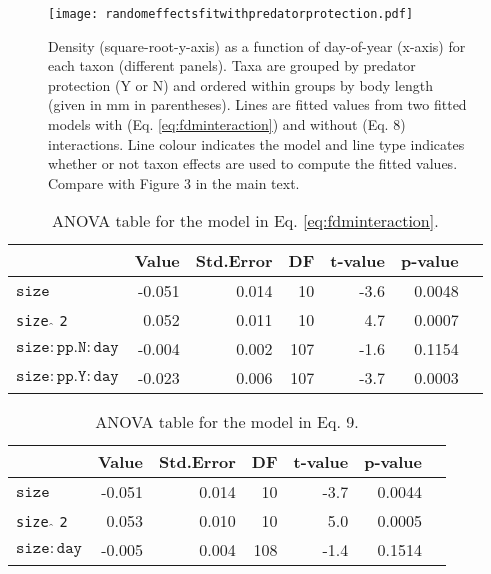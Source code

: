 \documentclass[12pt]{ecologyFORAPPENDIX}
\newcommand{\processfloatnow}{
	\begingroup
	\let\cleardoublepage\relax
	\let\clearpage\relax
	\processdelayedfloats
	\endgroup
}
\begin{document}
\begin{figure}
\vspace{-0.5cm}
\texttt{[image: randomeffectsfitwithpredatorprotection.pdf]}
\caption{Density (square-root-y-axis) as a function of day-of-year (x-axis) for each taxon (different panels).  Taxa are grouped by predator protection (Y or N) and ordered within groups by body length (given in mm in parentheses).  Lines are fitted values from two fitted models with (Eq. \ref{eq:fdminteraction}) and without (Eq. 8) interactions.  Line colour indicates the model and line type indicates whether or not taxon effects are used to compute the fitted values.  Compare with Figure 3 in the main text.}
\label{fig:randomeffectsfitwithpredatorprotection}
\end{figure}
\processfloatnow

\singlespace
\begin{table}
\caption{ANOVA table for the model in Eq. \ref{eq:fdminteraction}.}
\label{tab:ppanova}
\begin{tabular}{lrrrrrr}
\hline
                              & Value  & Std.Error & DF  & t-value & p-value \\
\hline
$\mathtt{size}$ 		      & -0.051& 0.014 	& 10   & -3.6 & 0.0048 \\
\texttt{size}  $\hat{}$ \texttt{2} 	      & 0.052 & 0.011  & 10   & 4.7  & 0.0007 \\
$\mathtt{size:pp.N:day}$& -0.004 & 0.002 & 107 & -1.6 & 0.1154 \\
$\mathtt{size:pp.Y:day}$ & -0.023 & 0.006 & 107 & -3.7 & 0.0003 \\
\hline
\end{tabular}
\end{table}
\processfloatnow
\doublespace


\singlespace
\begin{table}
\caption{ANOVA table for the model in Eq. 9.}
\label{tab:noppanova}
\begin{tabular}{lrrrrrr}
\hline
                              & Value  & Std.Error & DF  & t-value & p-value \\
\hline
$\mathtt{size}$ 		      & -0.051& 0.014 	& 10   & -3.7 & 0.0044 \\
\texttt{size}  $\hat{}$ \texttt{2} 	      & 0.053 & 0.010  & 10   & 5.0  & 0.0005 \\
$\mathtt{size:day}$ & -0.005 & 0.004 & 108 & -1.4 & 0.1514 \\
\hline
\end{tabular}
\end{table}
\processfloatnow
\doublespace



\end{document}
